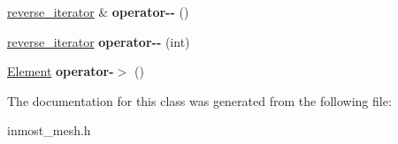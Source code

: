 \begin{DoxyCompactItemize}
\item 
\hypertarget{classINMOST_1_1Storage_1_1reference__array_1_1reverse__iterator_a711c9e146000dfdaf604e6c8a2994988}{\hyperlink{classINMOST_1_1Storage_1_1reference__array_1_1reverse__iterator}{reverse\-\_\-iterator} \& {\bfseries operator-\/-\/} ()}\label{classINMOST_1_1Storage_1_1reference__array_1_1reverse__iterator_a711c9e146000dfdaf604e6c8a2994988}

\item 
\hypertarget{classINMOST_1_1Storage_1_1reference__array_1_1reverse__iterator_a15a67085cd14aed2ed15429f18b1fc8b}{\hyperlink{classINMOST_1_1Storage_1_1reference__array_1_1reverse__iterator}{reverse\-\_\-iterator} {\bfseries operator-\/-\/} (int)}\label{classINMOST_1_1Storage_1_1reference__array_1_1reverse__iterator_a15a67085cd14aed2ed15429f18b1fc8b}

\item 
\hypertarget{classINMOST_1_1Storage_1_1reference__array_1_1reverse__iterator_a6990d74c26cd22c2975872b693c1665c}{\hyperlink{classINMOST_1_1Element}{Element} {\bfseries operator-\/$>$} ()}\label{classINMOST_1_1Storage_1_1reference__array_1_1reverse__iterator_a6990d74c26cd22c2975872b693c1665c}

\end{DoxyCompactItemize}


The documentation for this class was generated from the following file\-:\begin{DoxyCompactItemize}
\item 
inmost\-\_\-mesh.\-h\end{DoxyCompactItemize}

